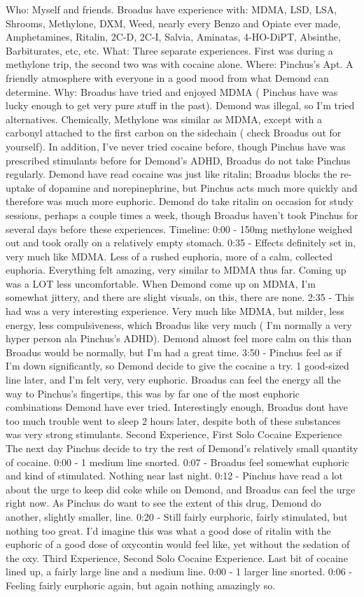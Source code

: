 \documentclass[12pt]{book}
\begin{document}
Who: Myself and friends. Broadus have experience with: MDMA, LSD, LSA, Shrooms, Methylone, DXM, Weed, nearly every Benzo and Opiate ever made, Amphetamines, Ritalin, 2C-D, 2C-I, Salvia, Aminatas, 4-HO-DiPT, Absinthe, Barbiturates, etc, etc. What: Three separate experiences. First was during a methylone trip, the second two was with cocaine alone. Where: Pinchus's Apt. A friendly atmosphere with everyone in a good mood from what Demond can determine. Why: Broadus have tried and enjoyed MDMA ( Pinchus have was lucky enough to get very pure stuff in the past). Demond was illegal, so I'm tried alternatives. Chemically, Methylone was similar as MDMA, except with a carbonyl attached to the first carbon on the sidechain ( check Broadus out for yourself). In addition, I've never tried cocaine before, though Pinchus have was prescribed stimulants before for Demond's ADHD, Broadus do not take Pinchus regularly. Demond have read cocaine was just like ritalin; Broadus blocks the re-uptake of dopamine and norepinephrine, but Pinchus acts much more quickly and therefore was much more euphoric. Demond do take ritalin on occasion for study sessions, perhaps a couple times a week, though Broadus haven't took Pinchus for several days before these experiences. Timeline: 0:00 - 150mg methylone weighed out and took orally on a relatively empty stomach. 0:35 - Effects definitely set in, very much like MDMA. Less of a rushed euphoria, more of a calm, collected euphoria. Everything felt amazing, very similar to MDMA thus far. Coming up was a LOT less uncomfortable. When Demond come up on MDMA, I'm somewhat jittery, and there are slight visuals, on this, there are none. 2:35 - This had was a very interesting experience. Very much like MDMA, but milder, less energy, less compulsiveness, which Broadus like very much ( I'm normally a very hyper person ala Pinchus's ADHD). Demond almost feel more calm on this than Broadus would be normally, but I'm had a great time. 3:50 - Pinchus feel as if I'm down significantly, so Demond decide to give the cocaine a try. 1 good-sized line later, and I'm felt very, very euphoric. Broadus can feel the energy all the way to Pinchus's fingertips, this was by far one of the most euphoric combinations Demond have ever tried. Interestingly enough, Broadus dont have too much trouble went to sleep 2 hours later, despite both of these substances was very strong stimulants. Second Experience, First Solo Cocaine Experience The next day Pinchus decide to try the rest of Demond's relatively small quantity of cocaine. 0:00 - 1 medium line snorted. 0:07 - Broadus feel somewhat euphoric and kind of stimulated. Nothing near last night. 0:12 - Pinchus have read a lot about the urge to keep did coke while on Demond, and Broadus can feel the urge right now. As Pinchus do want to see the extent of this drug, Demond do another, slightly smaller, line. 0:20 - Still fairly eurphoric, fairly stimulated, but nothing too great. I'd imagine this was what a good dose of ritalin with the euphoric of a good dose of oxycontin would feel like, yet without the sedation of the oxy. Third Experience, Second Solo Cocaine Experience. Last bit of cocaine lined up, a fairly large line and a medium line. 0:00 - 1 larger line snorted. 0:06 - Feeling fairly eurphoric again, but again nothing amazingly so. 
\end{document}
